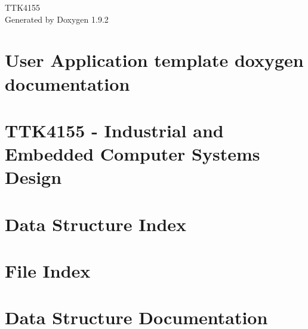 \documentclass[twoside]{book}
\newcommand{\+}{\discretionary{\mbox{\scriptsize$\hookleftarrow$}}{}{}}
\newcommand{\clearemptydoublepage}{%
    \newpage{\pagestyle{empty}\cleardoublepage}%
  }
\begin{document}
  \raggedbottom
    \hypersetup{pageanchor=false,
                bookmarksnumbered=true,
                pdfencoding=unicode
               }
  \begin{titlepage}
  \vspace*{7cm}
  \begin{center}%
  {\Large TTK4155}\\
  \vspace*{1cm}
  {\large Generated by Doxygen 1.9.2}\\
  \end{center}
  \end{titlepage}
  \clearemptydoublepage
  \tableofcontents
  \clearemptydoublepage
  \hypersetup{pageanchor=true}
\chapter{User Application template doxygen documentation}
\label{index}\hypertarget{index}{}
\chapter{TTK4155 -\/ Industrial and Embedded Computer Systems Design}
\label{md__d___progetti__t_t_k4155__r_e_a_d_m_e}

\chapter{Data Structure Index}

\chapter{File Index}

\chapter{Data Structure Documentation}








\end{document}
